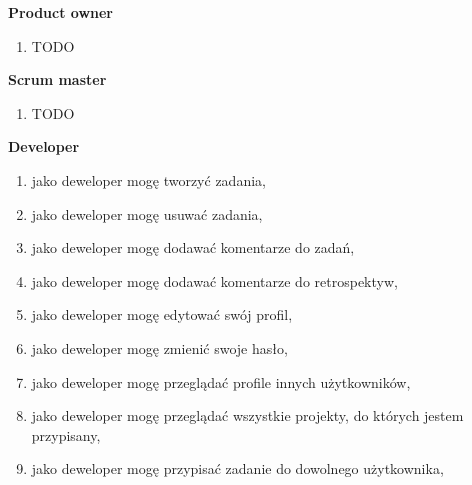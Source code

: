 \textbf{Product owner}
\begin{enumerate}		
	\item TODO
\end{enumerate}	
\textbf{Scrum master}
\begin{enumerate}		
	\item TODO
\end{enumerate}
\textbf{Developer}
\begin{enumerate}		
	\item jako deweloper mogę tworzyć zadania,
	\item jako deweloper mogę usuwać zadania,
	\item jako deweloper mogę dodawać komentarze do zadań,
	\item jako deweloper mogę dodawać komentarze do retrospektyw,
	\item jako deweloper mogę edytować swój profil,
	\item jako deweloper mogę zmienić swoje hasło,
	\item jako deweloper mogę przeglądać profile innych użytkowników,
	\item jako deweloper mogę przeglądać wszystkie projekty, do których jestem przypisany,
	\item jako deweloper mogę przypisać zadanie do dowolnego użytkownika,
	
\end{enumerate}

